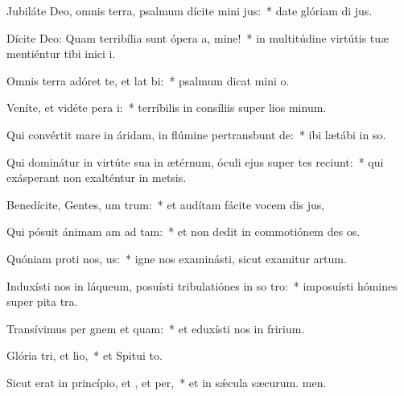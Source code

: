 \item Jubiláte Deo, omnis terra, psalmum dícite mini jus:~* date glóriam di jus.
\item Dícite Deo: Quam terribília sunt ópera a, mine!~* in multitúdine virtútis tuæ mentiéntur tibi inici i.
\item Omnis terra adóret te, et lat bi:~* psalmum dicat mini o.
\item Veníte, et vidéte pera i:~* terríbilis in consíliis super lios minum.
\item Qui convértit mare in áridam, in flúmine pertransbunt de:~* ibi lætábi in so.
\item Qui dominátur in virtúte sua in ætérnum, óculi ejus super tes reciunt:~* qui exásperant non exalténtur in metsis.
\item Benedícite, Gentes, um trum:~* et audítam fácite vocem dis jus,
\item Qui pósuit ánimam am ad tam:~* et non dedit in commotiónem des os.
\item Quóniam proti nos, us:~* igne nos examinásti, sicut examitur artum.
\item Induxísti nos in láqueum, posuísti tribulatiónes in so tro:~* imposuísti hómines super pita tra.
\item Transívimus per gnem et quam:~* et eduxísti nos in fririum.
\item Glória tri, et lio,~* et Spitui to.
\item Sicut erat in princípio, et , et per,~* et in sǽcula sæcurum. men.
